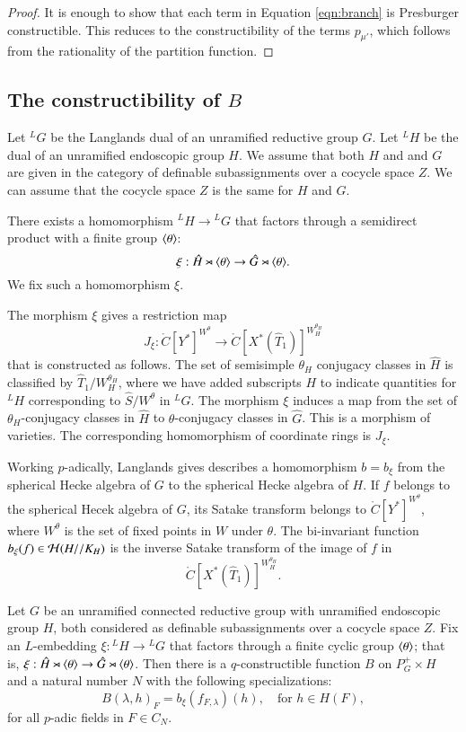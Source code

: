 \begin{proof} 
  It is enough to show that each term in Equation \ref{eqn:branch} is
  Presburger constructible.  This reduces to the constructibility of
  the terms $p_{\mu'}$, which follows from the rationality of the
  partition function.
\end{proof}


\subsection{The constructibility of $B$}\label{sec:B}

Let ${}^LG$ be the Langlands dual of an unramified reductive group
$G$.  Let ${}^LH$ be the dual of an unramified endoscopic group $H$.
We assume that both $H$ and and $G$ are given in the category of
definable subassignments over a cocycle space $Z$.  We can assume that
the cocycle space $Z$ is the same for $H$ and $G$.

There exists a homomorphism ${}^LH\to {}^LG$ that factors through a
semidirect product with a finite group $\langle{\theta}\rangle$:
\[
\xi:\hat H \rtimes \langle{\theta}\rangle \to \hat G \rtimes \langle{\theta}\rangle.
\]
We fix such a homomorphism $\xi$.  

The morphism $\xi$ gives a restriction map
\begin{equation}
J_\xi:\ring{C}[Y^*]^{W^\theta} \to \ring{C}[X^*(\hat T_1)]^{W_H^{\theta_H}}
\end{equation}
that is constructed as follows.  The set of semisimple $\theta_H$
conjugacy classes in $\hat H$ is classified by $\hat
T_1/W_H^{\theta_H}$, where we have added subscripts $H$ to indicate
quantities for ${}^LH$ corresponding to $\hat S/W^\theta$ in ${}^LG$.
The morphism $\xi$ induces a map from the set of $\theta_H$-conjugacy
classes in $\hat H$ to $\theta$-conjugacy classes in $\hat G$.  This
is a morphism of varieties. The corresponding homomorphism of
coordinate rings is $J_\xi$.

Working $p$-adically, Langlands gives describes a homomorphism $b =
b_\xi$ from the spherical Hecke algebra of $G$ to the spherical Hecke
algebra of $H$.  If $f$ belongs to the spherical Hecek algebra of $G$,
its Satake transform belongs to $\ring{C}[Y^*]^{W^\theta}$, where
$W^\theta$ is the set of fixed points in $W$ under $\theta$.  
The bi-invariant function $b_\xi(f)\in\mathcal H(H//K_H)$ is the inverse Satake transform 
of the image of $f$ in
\[
\ring{C}[X^*(\hat T_1)]^{W_H^{\theta_H}}.
\]


\begin{theorem}\label{thm:B}
  Let $G$ be an unramified connected reductive group with unramified
  endoscopic group $H$, both considered as definable subassignments
  over a cocycle space $Z$.  Fix an $L$-embedding $\xi:{}^LH\to {}^LG$
  that factors through a finite cyclic group $\langle{\theta}\rangle$; that is,
  $\xi:\hat H\rtimes \langle{\theta}\rangle \to \hat G \rtimes \langle{\theta}\rangle$.
  Then there is a $q$-constructible function $B$ on $P^+_G\times H$
  and a natural number $N$ with the following specializations:
\[
B(\lambda,h)_F = b_\xi(f_{F,\lambda})(h),\quad \text{for } h\in H(F),
\]
for all $p$-adic fields in $F\in C_N$.  
\end{theorem}

